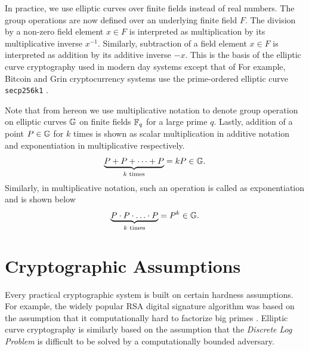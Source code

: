 In practice, we use elliptic curves over finite fields instead of real numbers.
The group operations are now defined over an underlying finite field $F$. 
The division by a non-zero field element $x \in F$ is interpreted as multiplication by its multiplicative inverse $x^{-1}$.
Similarly, subtraction of a field element $x \in F$ is interpreted as addition by its additive inverse $-x$.
This is the basis of the elliptic curve cryptography used in modern day systems except that of 
For example, Bitcoin and Grin cryptocurrency systems use the prime-ordered elliptic curve \texttt{secp256k1} \cite{Hess2000}.

Note that from hereon we use multiplicative notation to denote group operation on elliptic curves $\mathbb{G}$ on finite fields $\mathbb{F}_q$ for a large prime $q$. 
Lastly, addition of a point $P \in \mathbb{G}$ for $k$ times is shown as scalar multiplication in additive notation and exponentiation in multiplicative respectively.
\begin{equation*}
    \underbrace{P + P + \dots + P}_{k \text{ times}} = kP \in \mathbb{G}.
\end{equation*}
Similarly, in multiplicative notation, such an operation is called as exponentiation and is shown below 
\begin{equation*}
    \underbrace{P \cdot P \cdot \ldots \cdot P}_{k \text{ times}} = P^k \in \mathbb{G}.
\end{equation*}

\section{Cryptographic Assumptions}
\label{scn:assumptions}

Every practical cryptographic system is built on certain hardness assumptions.
For example, the widely popular RSA digital signature algorithm was based on the assumption that it computationally hard to factorize big primes \cite{RSA1978}.  
Elliptic curve cryptography is similarly based on the assumption that the \textit{Discrete Log Problem} is difficult to be solved by a computationally bounded adversary.


